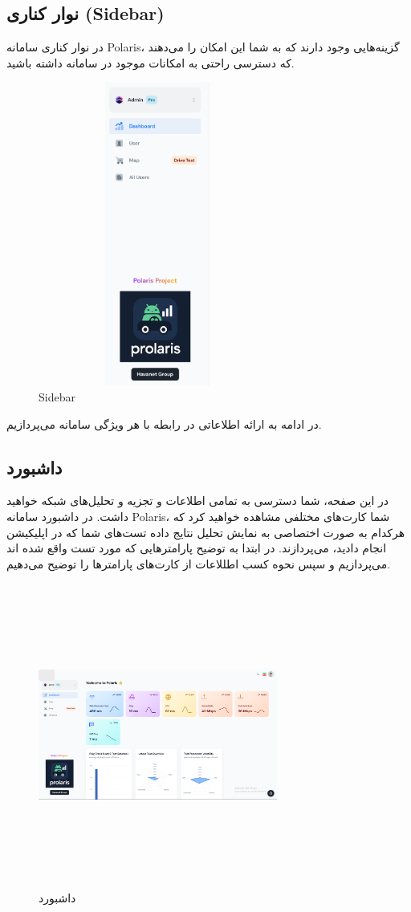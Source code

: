 \documentclass{report}
\begin{document}
\subsection{نوار کناری (Sidebar)}
در نوار کناری سامانه Polaris، گزینه‌هایی وجود دارند که به شما این امکان را می‌دهند که دسترسی راحتی به امکانات موجود در سامانه داشته باشید.
  \begin{figure}[ht]
	\centering
	\includegraphics[width=0.7\textwidth,height=10cm,keepaspectratio]{Pic/sidebar}
	\caption{Sidebar}
	\label{fig:sidebar}
\end{figure}
در ادامه به ارائه اطلاعاتی در رابطه با هر ویژگی سامانه می‌پردازیم.

\subsection{داشبورد}
در این صفحه، شما دسترسی به تمامی اطلاعات و تجزیه و تحلیل‌های شبکه خواهید داشت. در داشبورد سامانه Polaris، شما کارت‌های مختلفی مشاهده خواهید کرد که هرکدام به صورت اختصاصی به نمایش تحلیل نتایج داده‌ تست‌های شما که در اپلیکیشن انجام دادید، می‌پردازند. در ابتدا به توضیح پارامتر‌هایی که مورد تست واقع شده اند می‌پردازیم و سپس نحوه کسب اطللاعات از کارت‌های پارامتر‌ها را توضیح می‌دهیم.
 \begin{figure}[ht]
	\centering
	\includegraphics[width=0.7\textwidth,height=10cm,keepaspectratio]{Pic/dashboard}
	\caption{ داشبورد}
	\label{fig:dashboard}
\end{figure}
\end{document}
